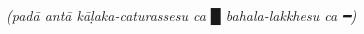 \documentclass[10pt, a4paper]{article}
\newcommand\sym[1]{{\symbolFont\selectfont #1}}
\begin{document}
\begin{Puzzle}{13}{9}%

\end{Puzzle}

\vspace*{\baselineskip}

{\centering
\textit{(padā antā kāḷaka-caturassesu ca \sym{█} bahala-lakkhesu ca \sym{━})}
\par}

\vspace*{\baselineskip}



\clearpage

\PuzzleSolution[true]

\begin{Puzzle}{13}{9}%

\end{Puzzle}
\end{document}
